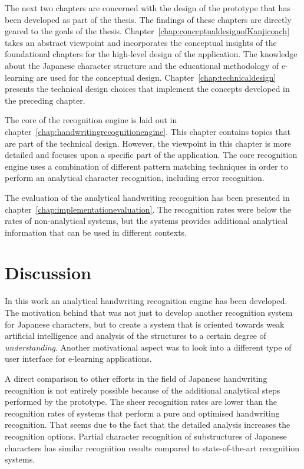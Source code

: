 The next two chapters are concerned with the design of the prototype
that has been developed as part of the thesis. The findings 
of these chapters are directly geared to the goals of the thesis.
Chapter~\ref{chap:conceptualdesignofKanjicoach} takes an abstract viewpoint 
and incorporates the conceptual insights of the foundational chapters for the 
high-level design of the application. The knowledge about the 
Japanese character structure and the educational methodology of e-learning
are used for the conceptual design.
Chapter~\ref{chap:technicaldesign} presents the 
technical design choices that implement the concepts developed in the
preceding chapter. 

The core of the recognition engine is laid out in 
chapter~\ref{chap:handwritingrecognitionengine}. This chapter contains topics
that are part of the technical design. However, the viewpoint in this chapter
is more detailed and focuses upon a specific part of the application. The core
recognition engine uses a combination of different pattern matching techniques
in order to perform an analytical character recognition, including error
recognition.

The evaluation of the analytical handwriting recognition has been
presented in chapter~\ref{chap:implementationevaluation}. The recognition rates
were below the rates of non-analytical systems, but the systems provides 
additional analytical information that can be used in different contexts.

\section{Discussion}
\label{sec:conclusion:discussion}

In this work an analytical handwriting recognition engine has been developed.
The motivation behind that was not just to develop another recognition system
for Japanese characters, but to create a system that is oriented towards
weak artificial intelligence and analysis of the structures to a certain degree
of \emph{understanding}. Another motivational aspect was to look into a
different type of user interface for e-learning applications.

A direct comparison to other efforts in the field of Japanese handwriting 
recognition is not entirely possible because of the additional analytical steps
performed by the prototype.
The sheer recognition rates are lower than the recognition rates of systems
that perform a pure and optimised handwriting recognition.
That seems due to the fact that the detailed analysis increases the 
recognition options.
Partial character recognition of substructures of Japanese characters
has similar recognition results compared to state-of-the-art recognition 
systems.

